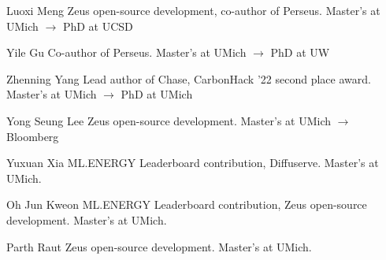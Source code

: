 

\begin{cvlist}

  \cvlistitem
    {Luoxi Meng}
    {Zeus open-source development, co-author of Perseus. Master's at UMich $\rightarrow$ PhD at UCSD}

  \cvlistitem
    {Yile Gu}
    {Co-author of Perseus. Master's at UMich $\rightarrow$ PhD at UW}

  \cvlistitem
    {Zhenning Yang}
    {Lead author of Chase, CarbonHack '22 second place award. Master's at UMich $\rightarrow$ PhD at UMich}

  \cvlistitem
    {Yong Seung Lee}
    {Zeus open-source development. Master's at UMich $\rightarrow$ Bloomberg}

  \cvlistitem
    {Yuxuan Xia}
    {ML.ENERGY Leaderboard contribution, Diffuserve. Master's at UMich.}

  \cvlistitem
    {Oh Jun Kweon}
    {ML.ENERGY Leaderboard contribution, Zeus open-source development. Master's at UMich.}

  \cvlistitem
    {Parth Raut}
    {Zeus open-source development. Master's at UMich.}

\end{cvlist}
